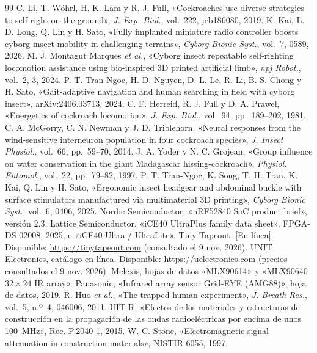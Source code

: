{\begin{thebibliography}{99}
 C. Li, T. Wöhrl, H. K. Lam y R. J. Full, «Cockroaches use diverse strategies to self-right on the ground», \textit{J. Exp. Biol.}, vol.~222, jeb186080, 2019.
 K. Kai, L. D. Long, Q. Lin y H. Sato, «Fully implanted miniature radio controller boosts cyborg insect mobility in challenging terrains», \textit{Cyborg Bionic Syst.}, vol.~7, 0589, 2026.
 M. J. Montagut Marques \textit{et al.}, «Cyborg insect repeatable self-righting locomotion assistance using bio-inspired 3D printed artificial limb», \textit{npj Robot.}, vol.~2, 3, 2024.
 P. T. Tran-Ngoc, H. D. Nguyen, D. L. Le, R. Li, B. S. Chong y H. Sato, «Gait-adaptive navigation and human searching in field with cyborg insect», arXiv:2406.03713, 2024.
 C. F. Herreid, R. J. Full y D. A. Prawel, «Energetics of cockroach locomotion», \textit{J. Exp. Biol.}, vol.~94, pp.~189--202, 1981.
 C. A. McGorry, C. N. Newman y J. D. Triblehorn, «Neural responses from the wind-sensitive interneuron population in four cockroach species», \textit{J. Insect Physiol.}, vol.~66, pp.~59--70, 2014.
 J. A. Yoder y N. C. Grojean, «Group influence on water conservation in the giant Madagascar hissing-cockroach», \textit{Physiol. Entomol.}, vol.~22, pp.~79--82, 1997.
 P. T. Tran-Ngoc, K. Song, T. H. Tran, K. Kai, Q. Lin y H. Sato, «Ergonomic insect headgear and abdominal buckle with surface stimulators manufactured via multimaterial 3D printing», \textit{Cyborg Bionic Syst.}, vol.~6, 0406, 2025.
 Nordic Semiconductor, «nRF52840 SoC product brief», versión 2.3.
 Lattice Semiconductor, «iCE40 UltraPlus family data sheet», FPGA-DS-02008, 2025; e «iCE40 Ultra / UltraLite».
 Tiny Tapeout. [En línea]. Disponible: \url{https://tinytapeout.com} (consultado el 9 nov. 2026).
 UNIT Electronics, catálogo en línea. Disponible: \url{https://uelectronics.com} (precios consultados el 9 nov. 2026).
 Melexis, hojas de datos «MLX90614» y «MLX90640 $32\times24$ IR array».
 Panasonic, «Infrared array sensor Grid-EYE (AMG88)», hoja de datos, 2019.
 R. Huo \textit{et al.}, «The trapped human experiment», \textit{J. Breath Res.}, vol.~5, n.º~4, 046006, 2011.
 UIT-R, «Efectos de los materiales y estructuras de construcción en la propagación de las ondas radioeléctricas por encima de unos 100~MHz», Rec. P.2040-1, 2015.
 W. C. Stone, «Electromagnetic signal attenuation in construction materials», NISTIR 6055, 1997.

\end{thebibliography}}
